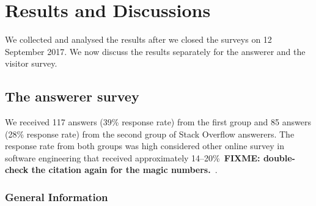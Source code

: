 \documentclass{svjour3}                     %
\newcommand\FIXME[1]{\textbf{FIXME: #1}}
\begin{document}
\section{Results and Discussions}
We collected and analysed the results after we closed the surveys on 12
September 2017. We now discuss the results separately for the answerer and the
visitor survey.

\subsection{The answerer survey}
We received 117 answers (39\% response rate) from the first group and 85 answers
(28\% response rate) from the second group of Stack Overflow answerers. The response
rate from both groups was high considered other online survey in software
engineering that received approximately 14--20\%~\FIXME{double-check the
	citation again for the magic numbers.}~\citep{Punter2003}.

\subsubsection{General Information}

\end{document}
